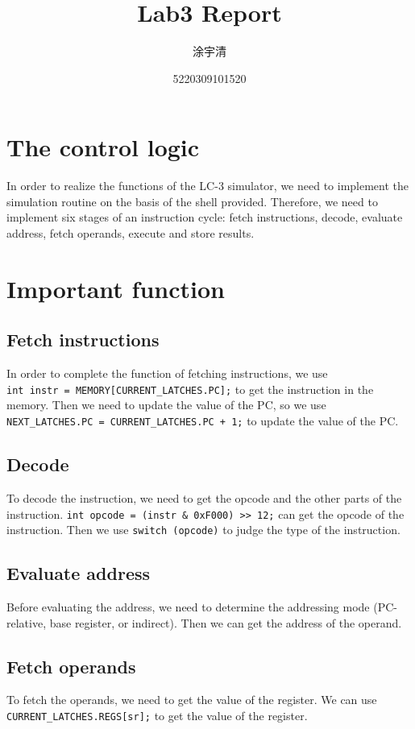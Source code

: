 \documentclass[UTF8,a4paper,12pt]{ctexart}
\title{\textbf{\LARGE{Lab3 Report}}}
\author{涂宇清}
\date{5220309101520}
\begin{document}
 
\maketitle

\setcounter{page}{1}        %
 
 
\section{The control logic}
In order to realize the functions of the LC-3 simulator, we need to implement the simulation routine on the basis of the shell provided. Therefore, we need to implement six stages of an instruction cycle: fetch instructions, decode, evaluate address, fetch operands, execute and store results.

\section{Important function}
\subsection{Fetch instructions}
In order to complete the function of fetching instructions, we use\\
\verb|int instr = MEMORY[CURRENT_LATCHES.PC];| to get the instruction in the memory. Then we need to update the value of the PC, so we use \verb|NEXT_LATCHES.PC = CURRENT_LATCHES.PC + 1;| to update the value of the PC.

\subsection{Decode}
To decode the instruction, we need to get the opcode and the other parts of the instruction. \verb|int opcode = (instr & 0xF000) >> 12;| can get the opcode of the instruction. Then we use \verb|switch (opcode)| to judge the type of the instruction.

\subsection{Evaluate address}
Before evaluating the address, we need to determine the addressing mode (PC-relative, base register, or indirect). Then we can get the address of the operand. 

\subsection{Fetch operands}
To fetch the operands, we need to get the value of the register. We can use\\
\verb|CURRENT_LATCHES.REGS[sr];| to get the value of the register.
\end{document}
